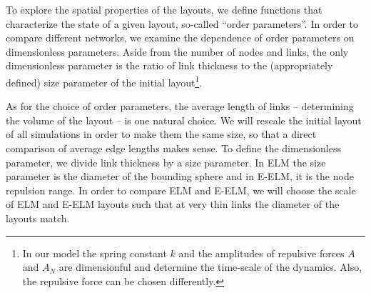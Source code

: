 \documentclass[nofootinbib,preprint,floatfix]{revtex4} %
\begin{document}
To explore the spatial  %
properties of the layouts, we define functions that characterize the state of a given layout, so-called ``order parameters''. 
In order to compare different networks, we examine the dependence of order parameters on dimensionless parameters.  
Aside from the number of nodes and links, %
the only dimensionless parameter is the ratio of link thickness to the (appropriately defined) size parameter of the initial layout\footnote{
In our model the spring constant $k$ and the amplitudes of repulsive forces $A$ and $A_N$ are dimensionful and determine the time-scale of the dynamics.
Also, the repulsive force can be chosen differently. }. 

As for the choice of order parameters, the average length of links -- determining the volume of the layout -- is one natural choice.  
We will rescale the initial layout of all simulations in order to make them the same size, so that a direct comparison of average edge lengths makes sense. To define the dimensionless parameter, we divide link thickness by a size parameter. 
In ELM the size parameter is the diameter of the bounding sphere and in E-ELM, it is the node repulsion range. 
In order to compare ELM and E-ELM, we will choose the scale of ELM and E-ELM layouts such that at very thin links the diameter of the layouts match. 
\end{document}
